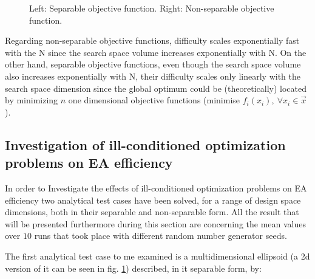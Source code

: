 \begin{figure}[h!]
\begin{minipage}[b]{1\linewidth}
 \centering
\end{minipage}
\caption{Left: Separable objective function. Right: Non-separable objective function.} 
\label{nonsep}
\end{figure}

Regarding non-separable objective functions, difficulty scales exponentially fast with the N since the search space volume increases exponentially with N. On the other hand, separable objective functions, even though the search space volume also increases exponentially with N, their difficulty scales only linearly with the search space dimension since the global optimum could be (theoretically) located by minimizing $n$ one dimensional objective functions (minimise $f_i(x_i),~ \forall x_i \in \vec{x}$).
 
\subsection{Investigation of ill-conditioned optimization problems on EA efficiency}
\label{Inv2}

In order to Investigate the effects of ill-conditioned optimization problems on EA efficiency two analytical test cases have been solved, for a range of design space dimensions, both in their separable and non-separable form. All the result that will be presented furthermore during this section are concerning the mean values over $10$ runs that took place with different random number generator seeds. 

The first analytical test case to me examined is a multidimensional ellipsoid (a 2d version of it can be seen in fig. \ref{nonsep}) described, in it separable form, by:   


